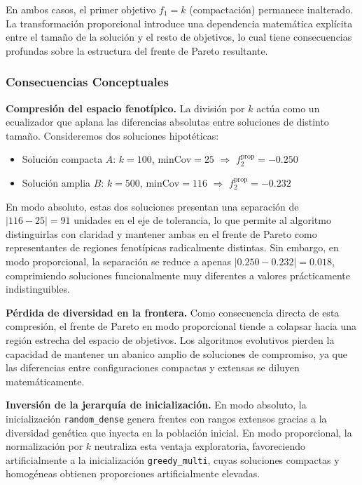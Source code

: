 \documentclass[a4paper,10pt]{article}
\begin{document}
En ambos casos, el primer objetivo $f_1 = k$ (compactación) permanece inalterado. La transformación proporcional introduce una dependencia matemática explícita entre el tamaño de la solución y el resto de objetivos, lo cual tiene consecuencias profundas sobre la estructura del frente de Pareto resultante.

\subsubsection{Consecuencias Conceptuales}

\textbf{Compresión del espacio fenotípico.} La división por $k$ actúa como un ecualizador que aplana las diferencias absolutas entre soluciones de distinto tamaño. Consideremos dos soluciones hipotéticas:
\begin{itemize}
    \item Solución compacta $A$: $k = 100$, $\text{minCov} = 25$ $\Rightarrow$ $f_2^{\text{prop}} = -0.250$
    \item Solución amplia $B$: $k = 500$, $\text{minCov} = 116$ $\Rightarrow$ $f_2^{\text{prop}} = -0.232$
\end{itemize}

En modo absoluto, estas dos soluciones presentan una separación de $|116 - 25| = 91$ unidades en el eje de tolerancia, lo que permite al algoritmo distinguirlas con claridad y mantener ambas en el frente de Pareto como representantes de regiones fenotípicas radicalmente distintas. Sin embargo, en modo proporcional, la separación se reduce a apenas $|0.250 - 0.232| = 0.018$, comprimiendo soluciones funcionalmente muy diferentes a valores prácticamente indistinguibles.

\textbf{Pérdida de diversidad en la frontera.} Como consecuencia directa de esta compresión, el frente de Pareto en modo proporcional tiende a colapsar hacia una región estrecha del espacio de objetivos. Los algoritmos evolutivos pierden la capacidad de mantener un abanico amplio de soluciones de compromiso, ya que las diferencias entre configuraciones compactas y extensas se diluyen matemáticamente.

\textbf{Inversión de la jerarquía de inicialización.} En modo absoluto, la inicialización \texttt{random\_dense} genera frentes con rangos extensos gracias a la diversidad genética que inyecta en la población inicial. En modo proporcional, la normalización por $k$ neutraliza esta ventaja exploratoria, favoreciendo artificialmente a la inicialización \texttt{greedy\_multi}, cuyas soluciones compactas y homogéneas obtienen proporciones artificialmente elevadas.
\end{document}
